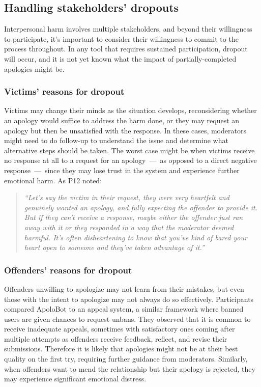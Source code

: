 \subsection{Handling stakeholders' dropouts}
Interpersonal harm involves multiple stakeholders, and beyond their willingness to participate, it's important to consider their willingness to commit to the process throughout. In any tool that requires sustained participation, dropout will occur, and it is not yet known what the impact of partially-completed apologies might be.

\subsubsection{Victims' reasons for dropout} Victims may change their minds as the situation develops, reconsidering whether an apology would suffice to address the harm done, or they may request an apology but then be unsatisfied with the response. In these cases, moderators might need to do follow-up to understand the issue and determine what alternative steps should be taken. The worst case might be when victims receive no response at all to a request for an apology~---~as opposed to a direct negative response~---~since they may lose trust in the system and experience further emotional harm. As P12 noted:
\begin{quote}
    \textit{``Let's say the victim in their request, they were very heartfelt and genuinely wanted an apology, and fully expecting the offender to provide it. But if they can't receive a response, maybe either the offender just ran away with it or they responded in a way that the moderator deemed harmful. It's often disheartening to know that you've kind of bared your heart open to someone and they've taken advantage of it.''}
\end{quote}
\subsubsection{Offenders' reasons for dropout} Offenders unwilling to apologize may not learn from their mistakes, but even those with the intent to apologize may not always do so effectively. Participants compared ApoloBot to an appeal system, a similar framework where banned users are given chances to request unbans. They observed that it is common to receive inadequate appeals, sometimes with satisfactory ones coming after multiple attempts as offenders receive feedback, reflect, and revise their submissions. Therefore it is likely that apologies might not be at their best quality on the first try, requiring further guidance from moderators. Similarly, when offenders want to mend the relationship but their apology is rejected, they may experience significant emotional distress.

